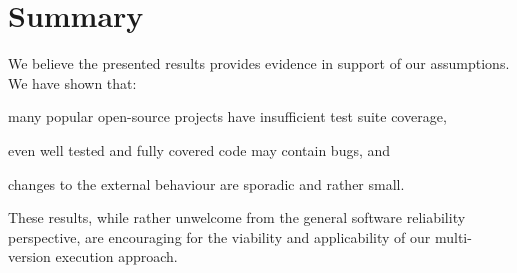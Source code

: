 \section{Summary}
\label{evolution:summary}

We believe the presented results provides evidence in support of our
assumptions. We have shown that:%
\begin{inparaenum}[(1)]
\item many popular open-source projects have insufficient test suite coverage,
\item even well tested and fully covered code may contain bugs, and
\item changes to the external behaviour are sporadic and rather small.
\end{inparaenum}
These results, while rather unwelcome from the general software reliability
perspective, are encouraging for the viability and applicability of our
multi-version execution approach.
